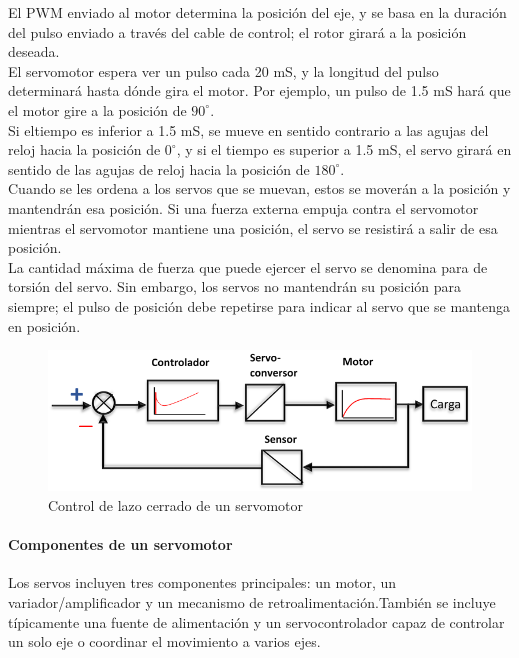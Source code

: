 \documentclass[12pt,titlepage]{article}
\begin{document}
El PWM enviado al motor determina la posición del eje, y se basa en la duración del pulso enviado a través del cable de control; el rotor girará a la posición deseada. \\ 

El servomotor espera ver un pulso cada 20 mS, y la longitud del pulso determinará hasta dónde gira el motor. Por ejemplo, un pulso de 1.5 mS hará que el motor gire a la posición de $90^{\circ}$. \\ 

Si eltiempo es inferior a 1.5 mS, se mueve en sentido contrario a las agujas del reloj hacia la posición de $0^{\circ}$, y si el tiempo es superior a 1.5 mS, el servo girará en sentido de las agujas de reloj hacia la posición de $180^{\circ}$. \\

Cuando se les ordena a los servos que se muevan, estos se moverán a la posición y mantendrán esa posición. Si una fuerza externa empuja contra el servomotor mientras el servomotor mantiene una posición, el servo se resistirá a salir de esa posición. \\ 

La cantidad máxima de fuerza que puede ejercer el servo se denomina para de torsión del servo. Sin embargo, los servos no mantendrán su posición para siempre; el pulso de posición debe repetirse para indicar al servo que se mantenga en posición. \\ 

\begin{figure}[htbp]
\hspace*{1.5cm} 
\includegraphics[scale=0.90]{SERVO}
\caption{Control de lazo cerrado de un servomotor}
\end{figure}

\paragraph{Componentes de un servomotor}\leavevmode\newline
Los servos incluyen tres componentes principales: un motor, un variador/amplificador y un mecanismo de retroalimentación.También se incluye típicamente una fuente de alimentación y un servocontrolador capaz de controlar un solo eje o coordinar el movimiento a varios ejes. \\ 
\end{document}
